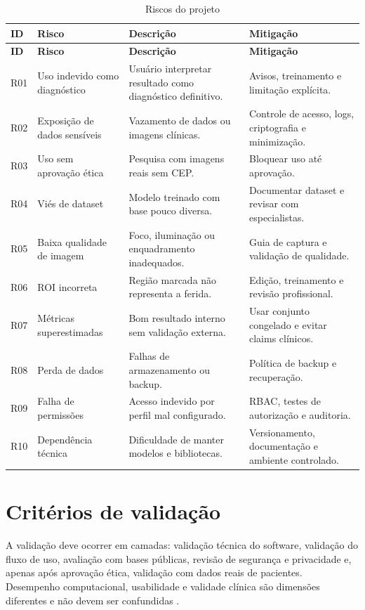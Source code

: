 \documentclass[
    12pt,
    oneside,
    a4paper,
    chapter=TITLE,
    brazil,
    sumario=tradicional,
    hidelinks
]{abntex2}
\begin{document}
\begin{longtable}{L{1.5cm}L{3.6cm}L{4.6cm}L{3.6cm}}
\caption{\label{tab:riscos}Riscos do projeto}\\
\toprule
\textbf{ID} & \textbf{Risco} & \textbf{Descrição} & \textbf{Mitigação} \\
\midrule
\endfirsthead
\toprule
\textbf{ID} & \textbf{Risco} & \textbf{Descrição} & \textbf{Mitigação} \\
\midrule
\endhead
R01 & Uso indevido como diagnóstico & Usuário interpretar resultado como diagnóstico definitivo. & Avisos, treinamento e limitação explícita. \\
R02 & Exposição de dados sensíveis & Vazamento de dados ou imagens clínicas. & Controle de acesso, logs, criptografia e minimização. \\
R03 & Uso sem aprovação ética & Pesquisa com imagens reais sem CEP. & Bloquear uso até aprovação. \\
R04 & Viés de dataset & Modelo treinado com base pouco diversa. & Documentar dataset e revisar com especialistas. \\
R05 & Baixa qualidade de imagem & Foco, iluminação ou enquadramento inadequados. & Guia de captura e validação de qualidade. \\
R06 & ROI incorreta & Região marcada não representa a ferida. & Edição, treinamento e revisão profissional. \\
R07 & Métricas superestimadas & Bom resultado interno sem validação externa. & Usar conjunto congelado e evitar claims clínicos. \\
R08 & Perda de dados & Falhas de armazenamento ou backup. & Política de backup e recuperação. \\
R09 & Falha de permissões & Acesso indevido por perfil mal configurado. & RBAC, testes de autorização e auditoria. \\
R10 & Dependência técnica & Dificuldade de manter modelos e bibliotecas. & Versionamento, documentação e ambiente controlado. \\
\bottomrule
\end{longtable}

\chapter{Critérios de validação}

A validação deve ocorrer em camadas: validação técnica do software, validação do fluxo de uso, avaliação com bases públicas, revisão de segurança e privacidade e, apenas após aprovação ética, validação com dados reais de pacientes. Desempenho computacional, usabilidade e validade clínica são dimensões diferentes e não devem ser confundidas \cite{anisuzzaman2022,dabas2023,who2023}.
\end{document}
